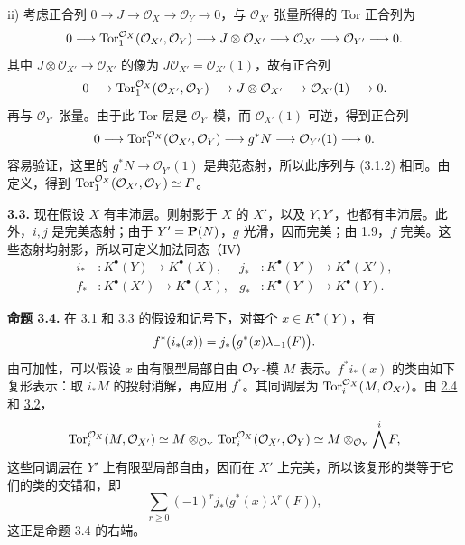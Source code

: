 ii) 考虑正合列 \(0\to J\to\mathcal O_X\to\mathcal O_Y\to0\)，与 \(\mathcal O_{X'}\) 张量所得的 Tor 正合列为
\[
 0\longrightarrow\operatorname{Tor}_1^{\mathcal O_X}(\mathcal O_{X'},\mathcal O_Y)
 \longrightarrow J\otimes\mathcal O_{X'}
 \longrightarrow\mathcal O_{X'}\longrightarrow\mathcal O_{Y'}\longrightarrow0.
\]
其中 \(J\otimes\mathcal O_{X'}\to\mathcal O_{X'}\) 的像为
\(J\mathcal O_{X'}=\mathcal O_{X'}(1)\)，故有正合列
\[
 0\longrightarrow\operatorname{Tor}_1^{\mathcal O_X}(\mathcal O_{X'},\mathcal O_Y)
 \longrightarrow J\otimes\mathcal O_{X'}
 \longrightarrow\mathcal O_{X'}(1)\longrightarrow0.
\]
再与 \(\mathcal O_{Y'}\) 张量。由于此 Tor 层是 \(\mathcal O_{Y'}\)-模，而 \(\mathcal O_{X'}(1)\) 可逆，得到正合列
\begin{equation}\notag
 0\longrightarrow\operatorname{Tor}_1^{\mathcal O_X}(\mathcal O_{X'},\mathcal O_Y)
 \longrightarrow g^*N\longrightarrow\mathcal O_{Y'}(1)\longrightarrow0.
\end{equation}
容易验证，这里的 \(g^*N\to\mathcal O_{Y'}(1)\) 是典范态射，所以此序列与 (3.1.2) 相同。由定义，得到
\(\operatorname{Tor}_1^{\mathcal O_X}(\mathcal O_{X'},\mathcal O_Y)\simeq F\)。

\textbf{3.3.} 现在假设 \(X\) 有丰沛层。则射影于 \(X\) 的 \(X'\)，以及 \(Y,Y'\)，也都有丰沛层。此外，\(i,j\) 是完美态射；由于 \(Y'=\mathbf P(N)\)，\(g\) 光滑，因而完美；由 1.9，\(f\) 完美。这些态射均射影，所以可定义加法同态（IV）
\[
\begin{aligned}
i_*&:K^\bullet(Y)\to K^\bullet(X), &
j_*&:K^\bullet(Y')\to K^\bullet(X'),\\
f_*&:K^\bullet(X')\to K^\bullet(X), &
g_*&:K^\bullet(Y')\to K^\bullet(Y).
\end{aligned}
\]

\textbf{命题 3.4.} 在 \hyperlink{sga6.e07.para.3-1}{3.1} 和 \hyperlink{sga6.e07.para.3-3}{3.3} 的假设和记号下，对每个 \(x\in K^\bullet(Y)\)，有
\begin{equation}\notag
f^*(i_*(x))=j_*\bigl(g^*(x)\lambda_{-1}(F)\bigr).
\end{equation}
由可加性，可以假设 \(x\) 由有限型局部自由 \(\mathcal O_Y\)-模 \(M\) 表示。\(f^*i_*(x)\) 的类由如下复形表示：取 \(i_*M\) 的投射消解，再应用 \(f^*\)。其同调层为 \(\operatorname{Tor}_i^{\mathcal O_X}(M,\mathcal O_{X'})\)。由 \hyperlink{sga6.e07.lem.2-4}{2.4} 和 \hyperlink{sga6.e07.lem.3-2}{3.2}，
\[
\operatorname{Tor}_i^{\mathcal O_X}(M,\mathcal O_{X'})
\simeq M\otimes_{\mathcal O_Y}\operatorname{Tor}_i^{\mathcal O_X}(\mathcal O_{X'},\mathcal O_Y)
\simeq M\otimes_{\mathcal O_Y}\bigwedge^iF,
\]
这些同调层在 \(Y'\) 上有限型局部自由，因而在 \(X'\) 上完美，所以该复形的类等于它们的类的交错和，即\[\sum_{r\geq0}(-1)^r j_*\bigl(g^*(x)\lambda^r(F)\bigr),\]这正是命题 3.4 的右端。

